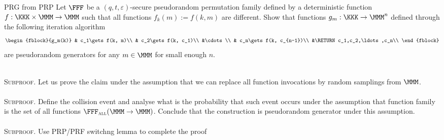 \documentclass{crypto-exercise}
\author{Sven Laur}
\begin{document}
\begin{exercise}{PRG from PRP}
Let $\FFF$ be a $(q,t,\varepsilon)$-secure pseudorandom permutation family defined by a deterministic function $f:\KKK\times\MMM\to\MMM$ such that all functions $f_k(m):=f(k,m)$ are different. Show that functions $g_m:\KKK\to\MMM^n$ defined through the following iteration algorithm
\begin{align*}
\begin{fblock}{g_m(k)}
& c_1\gets f(k, m)\\
& c_2\gets f(k, c_1)\\
&\cdots\\
& c_n\gets f(k, c_{n-1})\\ 
&\RETURN c_1,c_2,\ldots,c_n\\
\end{fblock}
\end{align*} 
are pseudorandom generators for any $m\in\MMM$ for small enough $n$.
\end{exercise}
\begin{solution}\ \\
\textsc{Subproof}. Let us prove the claim under the assumption that we can replace all function invocations by random samplings from  $\MMM$.\\\\
\textsc{Subproof}. Define the collision event and analyse what is the probability that such event occurs under the assumption that function family is the set of all functions
$\FFF_{\textsc{all}}(\MMM\to\MMM)$. Conclude that the construction is pseudorandom generator under this assumption.\\\\ 
\textsc{Subproof}. Use PRP/PRF switchng lemma to complete the proof
\end{solution}
\end{document}
